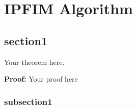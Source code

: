 \chapter{IPFIM Algorithm}
\label{chap:main-issue}


\cite{demoref}

\section{section1}






\begin{theorem}
Your theorem here.
\end{theorem}
\textbf{Proof:}
Your proof here
\QEDA

\subsection{subsection1}

